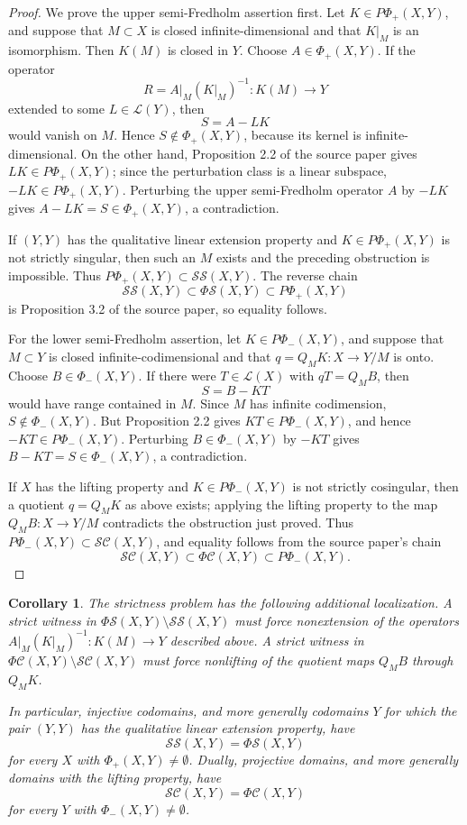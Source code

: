 \documentclass[11pt]{article}
\newtheorem{corollary}{Corollary}
\newcommand{\LL}{\mathcal L}
\newcommand{\SSing}{\mathcal{SS}}
\newcommand{\SCos}{\mathcal{SC}}
\newcommand{\PhiS}{\Phi\mathcal S}
\newcommand{\PhiC}{\Phi\mathcal C}
\begin{document}
\begin{proof}
We prove the upper semi-Fredholm assertion first.  Let \(K\in P\Phi_+(X,Y)\),
and suppose that \(M\subset X\) is closed infinite-dimensional and that
\(K|_M\) is an isomorphism.  Then \(K(M)\) is closed in \(Y\).  Choose
\(A\in\Phi_+(X,Y)\).  If the operator
\[
R=A|_M(K|_M)^{-1}:K(M)\to Y
\]
extended to some \(L\in\LL(Y)\), then
\[
S=A-LK
\]
would vanish on \(M\).  Hence \(S\notin\Phi_+(X,Y)\), because its kernel is
infinite-dimensional.  On the other hand, Proposition 2.2 of the source paper
gives \(LK\in P\Phi_+(X,Y)\); since the perturbation class is a linear
subspace, \(-LK\in P\Phi_+(X,Y)\).  Perturbing the upper semi-Fredholm
operator \(A\) by \(-LK\) gives \(A-LK=S\in\Phi_+(X,Y)\), a contradiction.

If \((Y,Y)\) has the qualitative linear extension property and
\(K\in P\Phi_+(X,Y)\) is not strictly singular, then such an \(M\) exists and
the preceding obstruction is impossible.  Thus
\(P\Phi_+(X,Y)\subset\SSing(X,Y)\).  The reverse chain
\[
\SSing(X,Y)\subset\PhiS(X,Y)\subset P\Phi_+(X,Y)
\]
is Proposition 3.2 of the source paper, so equality follows.

For the lower semi-Fredholm assertion, let \(K\in P\Phi_-(X,Y)\), and suppose
that \(M\subset Y\) is closed infinite-codimensional and that
\(q=Q_MK:X\to Y/M\) is onto.  Choose \(B\in\Phi_-(X,Y)\).  If there were
\(T\in\LL(X)\) with \(qT=Q_MB\), then
\[
S=B-KT
\]
would have range contained in \(M\).  Since \(M\) has infinite codimension,
\(S\notin\Phi_-(X,Y)\).  But Proposition 2.2 gives \(KT\in P\Phi_-(X,Y)\),
and hence \(-KT\in P\Phi_-(X,Y)\).  Perturbing \(B\in\Phi_-(X,Y)\) by
\(-KT\) gives \(B-KT=S\in\Phi_-(X,Y)\), a contradiction.

If \(X\) has the lifting property and \(K\in P\Phi_-(X,Y)\) is not strictly
cosingular, then a quotient \(q=Q_MK\) as above exists; applying the lifting
property to the map \(Q_MB:X\to Y/M\) contradicts the obstruction just proved.
Thus \(P\Phi_-(X,Y)\subset\SCos(X,Y)\), and equality follows from the source
paper's chain
\[
\SCos(X,Y)\subset\PhiC(X,Y)\subset P\Phi_-(X,Y).
\]
\end{proof}

\begin{corollary}
The strictness problem has the following additional localization.  A strict
witness in \(\PhiS(X,Y)\setminus\SSing(X,Y)\) must force nonextension of the
operators \(A|_M(K|_M)^{-1}:K(M)\to Y\) described above.  A strict witness in
\(\PhiC(X,Y)\setminus\SCos(X,Y)\) must force nonlifting of the quotient maps
\(Q_MB\) through \(Q_MK\).

In particular, injective codomains, and more generally codomains \(Y\) for
which the pair \((Y,Y)\) has the qualitative linear extension property, have
\[
\SSing(X,Y)=\PhiS(X,Y)
\]
for every \(X\) with \(\Phi_+(X,Y)\neq\emptyset\).  Dually, projective
domains, and more generally domains with the lifting property, have
\[
\SCos(X,Y)=\PhiC(X,Y)
\]
for every \(Y\) with \(\Phi_-(X,Y)\neq\emptyset\).
\end{corollary}
\end{document}
